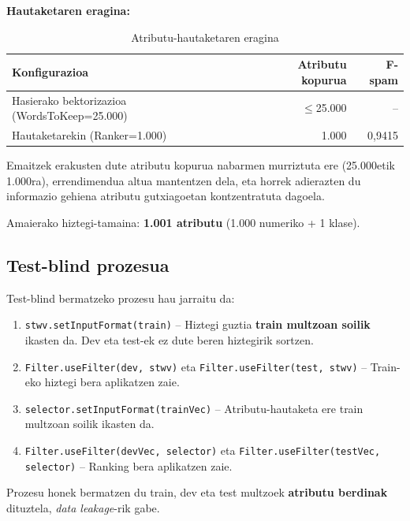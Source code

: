 \documentclass[12pt, a4paper]{article}
\begin{document}
\textbf{Hautaketaren eragina:}

\begin{table}[H]
    \centering
    \caption{Atributu-hautaketaren eragina}
    \begin{tabular}{lrr}
        \toprule
        \textbf{Konfigurazioa} & \textbf{Atributu kopurua} & \textbf{F-spam} \\
        \midrule
        Hasierako bektorizazioa (WordsToKeep=25.000) & $\leq$25.000 & -- \\
        Hautaketarekin (Ranker=1.000)             & 1.000        & 0,9415 \\
        \bottomrule
    \end{tabular}
    \label{tab:hautaketa}
\end{table}

Emaitzek erakusten dute atributu kopurua nabarmen murriztuta ere (25.000etik 1.000ra), errendimendua altua mantentzen dela, eta horrek adierazten du informazio gehiena atributu gutxiagoetan kontzentratuta dagoela.

Amaierako hiztegi-tamaina: \textbf{1.001 atributu} (1.000 numeriko + 1 klase).

\subsection{Test-blind prozesua}

Test-blind bermatzeko prozesu hau jarraitu da:

\begin{enumerate}
    \item \texttt{stwv.setInputFormat(train)} -- Hiztegi guztia \textbf{train multzoan
    soilik} ikasten da. Dev eta test-ek ez dute beren hiztegirik sortzen.
    \item \texttt{Filter.useFilter(dev, stwv)} eta \texttt{Filter.useFilter(test, stwv)}
    -- Train-eko hiztegi bera aplikatzen zaie.
    \item \texttt{selector.setInputFormat(trainVec)} -- Atributu-hautaketa ere
    train multzoan soilik ikasten da.
    \item \texttt{Filter.useFilter(devVec, selector)} eta
    \texttt{Filter.useFilter(testVec, selector)} -- Ranking bera aplikatzen zaie.
\end{enumerate}

Prozesu honek bermatzen du train, dev eta test multzoek \textbf{atributu berdinak}
dituztela, \textit{data leakage}-rik gabe.

\newpage
\end{document}

